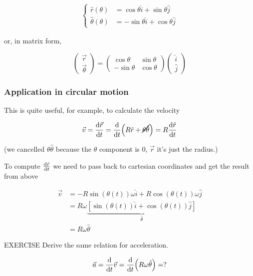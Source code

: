 \documentclass[10pt]{extarticle}
\begin{document}
\begin{align*}
    \begin{cases}
        \hat r(\theta)      & = \cos \theta \hat i + \sin \theta \hat j   \\
        \hat \theta(\theta) & = - \sin \theta \hat i + \cos \theta \hat j
    \end{cases}
\end{align*}

or, in matrix form,

$$
    \begin{pmatrix}
        \vec r \\
        \vec \theta
    \end{pmatrix}
    =
    \begin{pmatrix}
        \cos \theta  & \sin \theta \\
        -\sin \theta & \cos \theta
    \end{pmatrix}
    \begin{pmatrix}
        \hat i \\
        \hat j
    \end{pmatrix}
$$

\subsubsection{Application in circular motion}

This is quite useful, for example, to calculate the velocity

$$
    \vec v = \dv {\vec r}{t} = \dv{t} (R \hat r + \cancel{\theta \hat \theta})
    = R \dv{\hat r}{t}
$$

(we cancelled $\theta \hat \theta$ because the $\theta$ component is 0, $\vec r$ it's just the radius.)

To compute $\dv{\hat r}{t}$ we need to pass back to cartesian coordinates and get the result from above

\begin{align*}
    \vec{v} & = - R \sin (\theta(t)) \omega \hat i + R \cos (\theta(t)) \omega \hat j                   \\
            & = R \omega \underbrace{[\sin (\theta(t)) \hat i + \cos (\theta(t)) \hat j]}_{\hat \theta} \\
            & = R \omega \hat \theta
\end{align*}

\begin{bluebox}{EXERCISE}
    Derive the same relation for acceleration.

    $$
        \vec{a} = \dv {t} \vec v = \dv{t}(R \omega \hat \theta) = ?
    $$
\end{bluebox}
\end{document}
